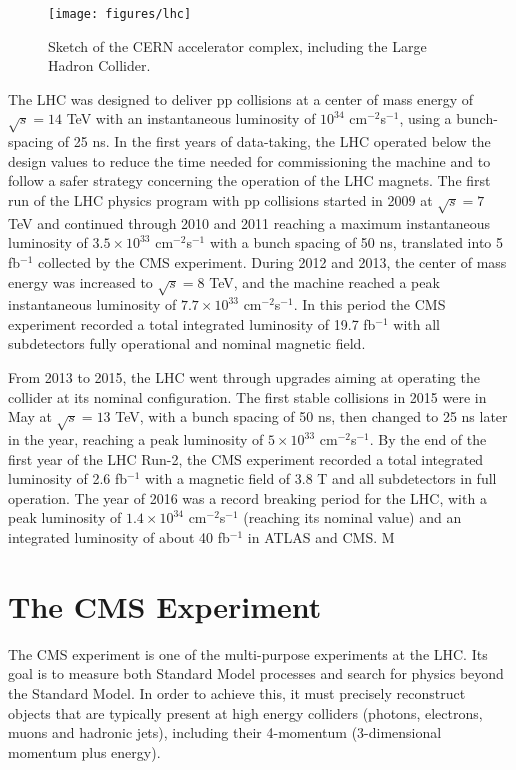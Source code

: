 \begin{figure}[h]
\centering 
\texttt{[image: figures/lhc]}\hfil
\caption{Sketch of the CERN accelerator complex, including the Large Hadron Collider. }
\label{fig:lhc}
\end{figure}

The LHC was designed to deliver pp collisions at a center of mass energy of $\sqrt{s} = 14$ TeV with an instantaneous luminosity of $10^{34}$ cm$^{-2}$s$^{-1}$, using a bunch-spacing of 25 ns. 
In the first years of data-taking, the LHC operated below the design values to reduce the time needed for commissioning the machine and to follow a safer strategy concerning the operation of the LHC magnets.
The first run of the LHC physics program with pp collisions started in 2009 at $\sqrt{s} = 7$ TeV and continued through 2010 and 2011 reaching a maximum instantaneous luminosity of $3.5 \times 10^{33}$ cm$^{-2}$s$^{-1}$ with a bunch spacing of 50 ns, translated into 5 fb$^{-1}$ collected by the CMS experiment. 
During 2012 and 2013, the center of mass energy was increased to $\sqrt{s} = 8$ TeV, and the machine reached a peak instantaneous luminosity of $7.7 \times 10^{33}$ cm$^{-2}$s$^{-1}$. 
In this period the CMS experiment recorded a total integrated luminosity of 19.7 fb$^{-1}$ with all subdetectors fully operational and nominal magnetic field.

From 2013 to 2015, the LHC went through upgrades aiming at operating the collider at its nominal configuration. 
The first stable collisions in 2015 were in May at $\sqrt{s} = 13$ TeV, with a bunch spacing of 50 ns, then changed to 25 ns later in the year, reaching a peak luminosity of $5 \times 10^{33}$ cm$^{-2}$s$^{-1}$. 
By the end of the first year of the LHC Run-2, the CMS experiment recorded a total integrated
luminosity of 2.6 fb$^{-1}$ with a magnetic field of 3.8 T and all subdetectors in full operation. 
The year of 2016 was a record breaking period for the LHC, with a peak luminosity of $1.4\times10^{34}$ cm$^{-2}$s$^{-1}$ (reaching its nominal value) and an integrated luminosity of about 40 fb$^{-1}$ in ATLAS and CMS. M

\section{The CMS Experiment}

The CMS experiment is one of the multi-purpose experiments at the LHC. 
Its goal is to measure both Standard Model processes and search for physics beyond the Standard Model. 
In order to achieve this, it must precisely reconstruct objects that are typically present at high energy colliders (photons, electrons, muons and hadronic jets), including their 4-momentum (3-dimensional momentum plus energy).  

